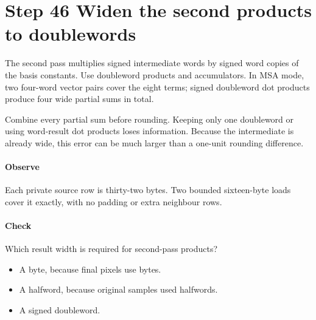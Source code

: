 \section{Step 46 Widen the second products to doublewords}\label{h263-transform-s06}
The second pass multiplies signed intermediate words by signed word copies of
the basis constants. Use doubleword products and accumulators. In MSA mode,
two four-word vector pairs cover the eight terms; signed doubleword dot products
produce four wide partial sums in total.

Combine every partial sum before rounding. Keeping only one doubleword or using
word-result dot products loses information. Because the intermediate is already
wide, this error can be much larger than a one-unit rounding difference.

\paragraph{Observe} Each private source row is thirty-two bytes. Two bounded
sixteen-byte loads cover it exactly, with no padding or extra neighbour rows.
\paragraph{Check} Which result width is required for second-pass products?
\begin{itemize}
  \item[A.] A byte, because final pixels use bytes.
  \item[B.] A halfword, because original samples used halfwords.
  \item[C.] A signed doubleword.
\end{itemize}
